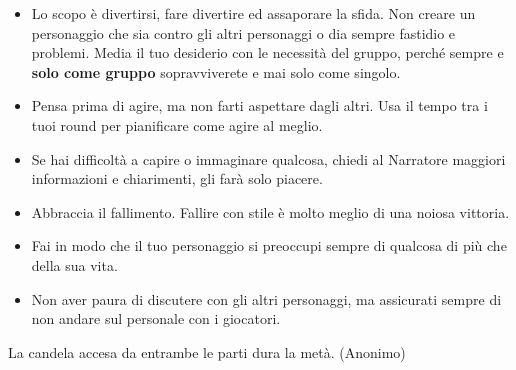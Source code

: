 \begin{multicols}{2}
\begin{itemize}[leftmargin=*]
\item
Lo scopo è divertirsi, fare divertire ed assaporare la sfida. Non creare un personaggio che sia contro gli altri personaggi o dia sempre fastidio e problemi. Media il tuo desiderio con le necessità del gruppo, perché sempre e \textbf{solo come gruppo} sopravviverete e mai solo come singolo.

\item
Pensa prima di agire, ma non farti aspettare dagli altri. Usa il tempo tra i tuoi round per pianificare come agire al meglio.

\item
Se hai difficoltà a capire o immaginare qualcosa, chiedi al Narratore maggiori informazioni e chiarimenti, gli farà solo piacere.

\item
Abbraccia il fallimento. Fallire con stile è molto meglio di una noiosa vittoria.

\item
Fai in modo che il tuo personaggio si preoccupi sempre di qualcosa di più che della sua vita.

\item
Non aver paura di discutere con gli altri personaggi, ma assicurati sempre di non andare sul personale con i giocatori.

\end{itemize}

\end{multicols}

\vfill

\begin{enfasi}{
La candela accesa da entrambe le parti dura la metà. (Anonimo)
}\end{enfasi}







\pagebreak
